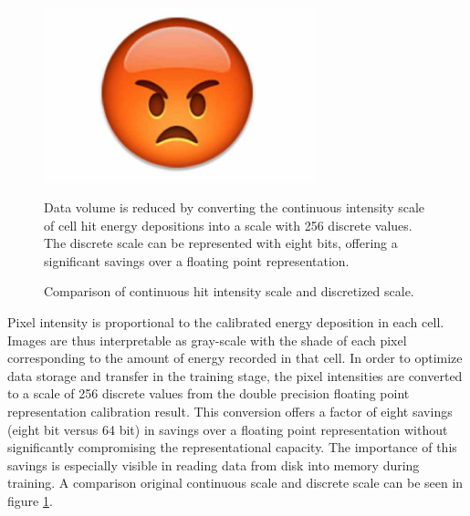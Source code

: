 \begin{figure}[t]
\begin{center}
\includegraphics[width=0.7\textwidth]{figures/dummy/dummy.jpg}

\end{center}
\caption{Comparison of continuous hit intensity scale and discretized scale.}{
Data volume is reduced by converting the continuous intensity scale of cell
hit energy depositions into a scale with 256 discrete values.
The discrete scale can be represented with eight bits, offering a significant
savings over a floating point representation.
}
\label{pixelmapadc}
\end{figure}


Pixel intensity is proportional to the calibrated energy deposition
in each cell.
Images are thus interpretable as gray-scale with the shade of
each pixel corresponding to the amount of energy recorded in that cell.
In order to optimize data storage and transfer in the training stage,
the pixel intensities are converted to a scale of 256 discrete values
from the double precision floating point representation calibration result.
This conversion offers a factor of eight savings (eight bit versus 64 bit) in
savings over a floating point representation
without significantly compromising the representational capacity.
The importance of this savings is especially visible in reading data from
disk into memory during training.
A comparison original continuous scale and discrete scale can be seen in figure
\ref{pixelmapadc}.

